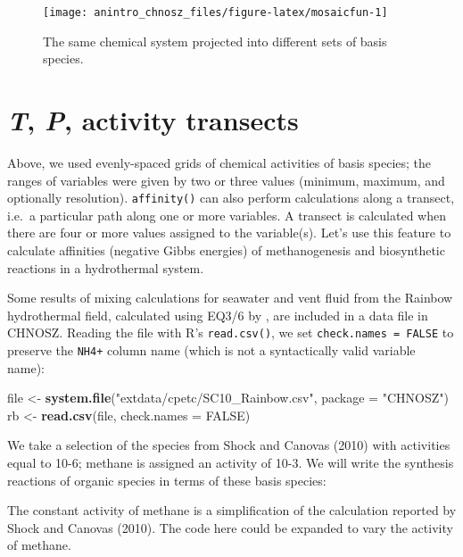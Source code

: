 \documentclass[]{tufte-book}
\newenvironment{Shaded}{}{}
\newcommand{\KeywordTok}[1]{\textcolor[rgb]{0.00,0.44,0.13}{\textbf{#1}}}
\newcommand{\DataTypeTok}[1]{\textcolor[rgb]{0.56,0.13,0.00}{#1}}
\newcommand{\StringTok}[1]{\textcolor[rgb]{0.25,0.44,0.63}{#1}}
\newcommand{\OtherTok}[1]{\textcolor[rgb]{0.00,0.44,0.13}{#1}}
\newcommand{\NormalTok}[1]{#1}
\begin{document}
\begin{figure}
\texttt{[image: anintro\_chnosz\_files/figure-latex/mosaicfun-1]} \caption[The same chemical system projected into different sets of basis species]{The same chemical system projected into different sets of basis species.}\label{fig:mosaicfun}
\end{figure}

\hypertarget{t-p-activity-transects}{\section{\texorpdfstring{\emph{T},
\emph{P}, activity
transects}{T, P, activity transects}}\label{t-p-activity-transects}}

Above, we used evenly-spaced grids of chemical activities of basis
species; the ranges of variables were given by two or three values
(minimum, maximum, and optionally resolution). {\texttt{affinity()}} can
also perform calculations along a transect, i.e.~a particular path along
one or more variables. A transect is calculated when there are four or
more values assigned to the variable(s). Let's use this feature to
calculate affinities (negative Gibbs energies) of methanogenesis and
biosynthetic reactions in a hydrothermal system.

Some results of mixing calculations for seawater and vent fluid from the
Rainbow hydrothermal field, calculated using EQ3/6 by \citet{SC10}, are
included in a data file in CHNOSZ. Reading the file with R's
\texttt{read.csv()}, we set \texttt{check.names\ =\ FALSE} to preserve
the \texttt{NH4+} column name (which is not a syntactically valid
variable name):

\begin{Shaded}
\begin{Highlighting}[]
\NormalTok{file <-}\StringTok{ }\KeywordTok{system.file}\NormalTok{(}\StringTok{"extdata/cpetc/SC10_Rainbow.csv"}\NormalTok{, }\DataTypeTok{package =} \StringTok{"CHNOSZ"}\NormalTok{)}
\NormalTok{rb <-}\StringTok{ }\KeywordTok{read.csv}\NormalTok{(file, }\DataTypeTok{check.names =} \OtherTok{FALSE}\NormalTok{)}
\end{Highlighting}
\end{Shaded}

We take a selection of the species from Shock and Canovas (2010) with
activities equal to 10-6; methane is assigned an activity of 10-3. We
will write the synthesis reactions of organic species in terms of these
basis species:

\begin{marginfigure}
The constant activity of methane is a simplification of the calculation
reported by Shock and Canovas (2010). The code here could be expanded to
vary the activity of methane.
\end{marginfigure}
\end{document}
